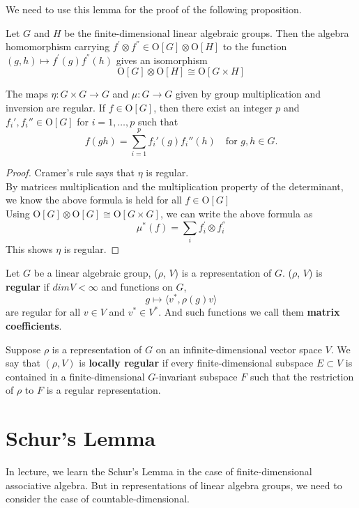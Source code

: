 \documentclass[12pt]{article}
\newenvironment{definition}[2][Definition]{\begin{trivlist}
\item[\hskip \labelsep {\bfseries #1}\hskip \labelsep {\bfseries #2.}]}{\end{trivlist}}
\newenvironment{lemma}[2][Lemma]{\begin{trivlist}
\item[\hskip \labelsep {\bfseries #1}\hskip \labelsep {\bfseries #2.}]}{\end{trivlist}}
\newenvironment{proposition}[2][Proposition]{\begin{trivlist}
\item[\hskip \labelsep {\bfseries #1}\hskip \labelsep {\bfseries #2.}]}{\end{trivlist}}
\begin{document}
We need to use this lemma for the proof of the following proposition.
    \begin{lemma}{2.3}
        Let $G$ and $H$ be the finite-dimensional linear algebraic groups. Then the algebra homomorphism carrying $f^{'} \otimes f^{''} \in \mathrm{O}[G]\otimes \mathrm{O}[H]$ to the function $(g,h)\mapsto f^{'}(g)f^{''}(h)$ gives an isomorphism
        $$
            \mathrm{O}[G] \otimes \mathrm{O}[H] \cong \mathrm{O}[G \times H]
        $$
    \end{lemma}
\begin{proposition}{2.4}
    The maps $\eta:G\times G \to G$ and $\mu:G \to G$ given by group multiplication and inversion are regular. If $f \in \mathrm{O}[G]$, then there exist an integer $p$ and $f_i', f_i'' \in \mathrm{O}[G]$ for $i = 1, \dots, p$ such that
\[
f(gh) = \sum_{i=1}^p f_i'(g) f_i''(h) \quad \text{for } g, h \in G.
\]
\end{proposition}
\begin{proof}
        Cramer's rule says that $\eta$ is regular.\\
        By matrices multiplication and the multiplication property of the determinant, we know the above formula is held for all $f\in \mathrm{O}[G]$\\
        Using $\mathrm{O}[G] \otimes \mathrm{O}[G] \cong \mathrm{O}[G \times G]$, we can write the above formula as
        $$
            \mu^{*}(f)=\sum_i f_{i}^{'}\otimes f_{i}^{''}
        $$
        This shows $\eta$ is regular.
    \end{proof}
\begin{definition}{2.5}
    Let $G$ be a linear algebraic group, ($\rho$, $V$) is a representation of $G$. ($\rho$, $V$) is \textbf{regular} if $dimV<\infty$ and functions on $G$, $$g\mapsto\langle v^*,\rho(g)v\rangle$$are regular for all $v\in V$ and $v^*\in V^*$. And such functions we call them \textbf{matrix coefficients}.
\end{definition}

\begin{definition}{2.6}
   Suppose $ \rho $ is a representation of $ G $ on an infinite-dimensional vector space $ V $. 
    We say that $ (\rho, V) $ is \textbf{locally regular} if every finite-dimensional subspace $ E \subset V $ is contained in a finite-dimensional $ G $-invariant subspace $ F $ such that the restriction of $ \rho $ to $ F $ is a regular representation.
\end{definition}

\section{Schur's Lemma}
In lecture, we learn the Schur's Lemma in the case of finite-dimensional associative algebra. But in representations of linear algebra groups, we need to consider the case of countable-dimensional.
\end{document}
